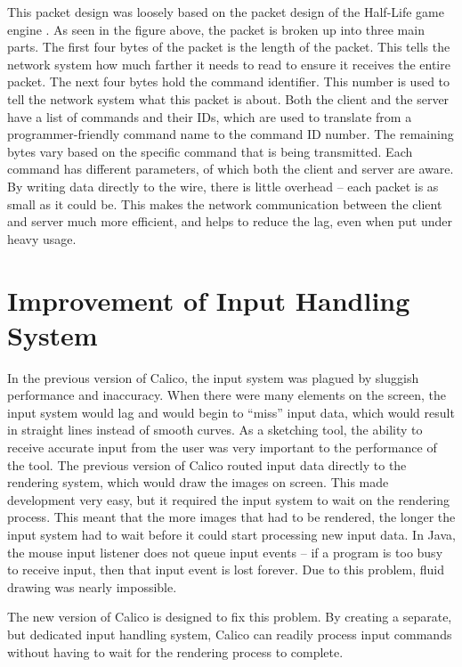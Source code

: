 This packet design was loosely based on the packet design of the Half-Life game engine \cite{rcon}. As seen in the figure above, the packet is broken up into three main parts. The first four bytes of the packet is the length of the packet. This tells the network system how much farther it needs to read to ensure it receives the entire packet. The next four bytes hold the command identifier. This number is used to tell the network system what this packet is about. Both the client and the server have a list of commands and their IDs, which are used to translate from a programmer-friendly command name to the command ID number. The remaining bytes vary based on the specific command that is being transmitted. Each command has different parameters, of which both the client and server are aware. By writing data directly to the wire, there is little overhead -- each packet is as small as it could be. This makes the network communication between the client and server much more efficient, and helps to reduce the lag, even when put under heavy usage.

\section{Improvement of Input Handling System}
In the previous version of Calico, the input system was plagued by sluggish performance and inaccuracy. When there were many elements on the screen, the input system would lag and would begin to ``miss'' input data, which would result in straight lines instead of smooth curves. As a sketching tool, the ability to receive accurate input from the user was very important to the performance of the tool. The previous version of Calico routed input data directly to the rendering system, which would draw the images on screen. This made development very easy, but it required the input system to wait on the rendering process. This meant that the more images that had to be rendered, the longer the input system had to wait before it could start processing new input data. In Java, the mouse input listener does not queue input events -- if a program is too busy to receive input, then that input event is lost forever. Due to this problem, fluid drawing was nearly impossible.   

The new version of Calico is designed to fix this problem. By creating a separate, but dedicated input handling system, Calico can readily process input commands without having to wait for the rendering process to complete.

